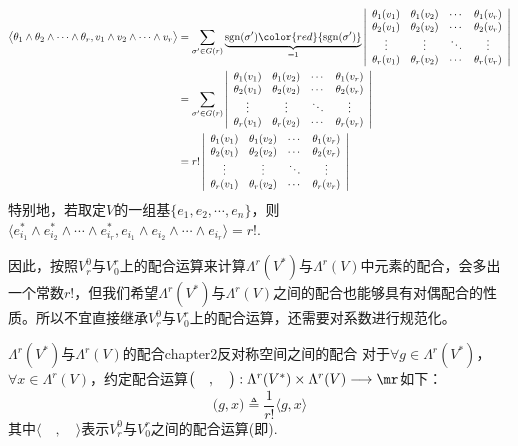 \[
\begin{split}
	\bigl\langle\theta_{1}\wedge \theta_{2}\wedge\cdots\wedge \theta_{r} ,v_{1}\wedge v_{2}\wedge \cdots\wedge v_{r} \bigr\rangle&=\sum_{\sigma^{\prime}\in G(r)}\underbrace{\operatorname{sgn}(\sigma^{\prime}) {\color{red}{\operatorname{sgn}(\sigma^{\prime})}} }_{=1} \left|\begin{array}{cccc}\theta_{1}(v_{1}) & \theta_{1}(v_{2}) & \cdots & \theta_{1}(v_{r}) \\ \theta_{2}(v_{1}) & \theta_{2}(v_{2}) & \cdots & \theta_{2}(v_{r}) \\ \vdots & \vdots & \ddots& \vdots \\ \theta_{r}(v_{1}) & \theta_{r}(v_{2}) & \cdots & \theta_{r}(v_{r})\end{array}\right|\\
	&=\sum_{\sigma^{\prime}\in G(r)}\left|\begin{array}{cccc}\theta_{1}(v_{1}) & \theta_{1}(v_{2}) & \cdots & \theta_{1}(v_{r}) \\ \theta_{2}(v_{1}) & \theta_{2}(v_{2}) & \cdots & \theta_{2}(v_{r}) \\ \vdots & \vdots & \ddots& \vdots \\ \theta_{r}(v_{1}) & \theta_{r}(v_{2}) & \cdots & \theta_{r}(v_{r})\end{array}\right|\\
	&=r! \left|\begin{array}{cccc}\theta_{1}(v_{1}) & \theta_{1}(v_{2}) & \cdots & \theta_{1}(v_{r}) \\ \theta_{2}(v_{1}) & \theta_{2}(v_{2}) & \cdots & \theta_{2}(v_{r}) \\ \vdots & \vdots & \ddots& \vdots \\ \theta_{r}(v_{1}) & \theta_{r}(v_{2}) & \cdots & \theta_{r}(v_{r})\end{array}\right|
\end{split}
\]
特别地，若取定$V$的一组基$\{e_{1} ,e_{2},\cdots,e_{n}\}$，则$\bigl\langle e^{\ast}_{i_{1}}\wedge e^{\ast}_{i_{2}}\wedge \cdots\wedge e^{\ast}_{i_{r}} ,e_{i_{1}}\wedge e_{i_{2}}\wedge \cdots\wedge e_{i_{r}} \bigr\rangle=r!$.

因此，按照$V^{0}_{r}$与$V^{r}_{0}$上的配合运算来计算$\Lambda^{r}(V^{\ast})$与$\Lambda^{r}(V)$中元素的配合，会多出一个常数$r!$，但我们希望$\Lambda^{r}(V^{\ast})$与$\Lambda^{r}(V)$之间的配合也能够具有对偶配合的性质。所以不宜直接继承$V^{0}_{r}$与$V^{r}_{0}$上的配合运算，还需要对系数进行规范化。
\begin{mydef}{$\Lambda^{r}(V^{\ast})$与$\Lambda^{r}(V)$的配合}{chapter2反对称空间之间的配合}
对于$\forall g\in \Lambda^{r}(V^{\ast})$，$\forall x\in \Lambda^{r}(V)$，约定配合运算$\bigl(\quad,\quad \bigr):\Lambda^{r}(V^{\ast})\times \Lambda^{r}(V)\longrightarrow \mr$如下：
\[
\bigl(g,x \bigr) \triangleq \frac{1}{r!} \langle g,x \rangle
\]
其中$\langle\quad,\quad\rangle$表示$V^{0}_{r}$与$V^{r}_{0}$之间的配合运算(即). 
\end{mydef}

